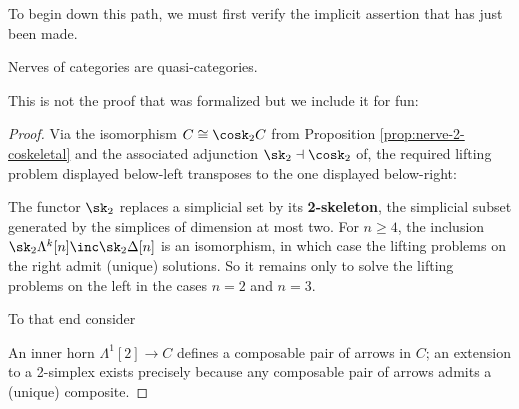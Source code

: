  To begin down this path, we must first verify the implicit assertion that has just been made.

 \begin{proposition}\label{prop:nerve-qcat}
  \leanok
  Nerves of categories are quasi-categories.
 \end{proposition}

This is not the proof that was formalized but we include it for fun:

 \begin{proof}
  \leanok
 Via the isomorphism $C \cong \cosk_2C$ from Proposition \ref{prop:nerve-2-coskeletal} and the associated adjunction $\sk_2 \dashv \cosk_2$ of,   %
  the required lifting problem displayed below-left transposes to the one displayed below-right:
 \begin{center}
 \end{center}
 The functor $\sk_2$ replaces a simplicial set by its \textbf{2-skeleton}, the simplicial subset generated by the simplices of dimension at most two. For $n \geq 4$, the inclusion $\sk_2\Lambda^k[n]\inc\sk_2\Delta[n]$ is an isomorphism, in which case the lifting problems on the right admit (unique) solutions. So it remains only to solve the lifting problems on the left in the cases $n=2$ and $n=3$.

To that end consider
 \begin{center}
 \end{center}
 An inner horn $\Lambda^1[2] \to C$ defines a composable pair of arrows in $C$; an extension to a 2-simplex exists precisely because any composable pair of arrows admits a (unique) composite.


\end{proof}
